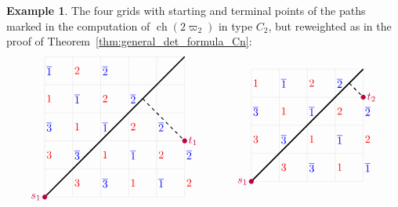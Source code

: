 \documentclass[11pt, leqno]{amsart}
\theoremstyle{plain}
\theoremstyle{definition}
\newtheorem{example}[theorem]{Example}
\numberwithin{equation}{section}
\newcommand{\fw}{\varpi} %
\newcommand{\ch}{\operatorname{ch}} %
\newcommand{\ofour}{\overline{4}}
\newcommand{\othree}{\overline{3}}
\newcommand{\otwo}{\overline{2}}
\newcommand{\one}{\overline{1}}
\begin{document}
\begin{example}
The four grids with starting and terminal points of the paths marked in the computation of $\ch(2\fw_2)$ in type $C_2$, but reweighted as in the proof of Theorem~\ref{thm:general_det_formula_Cn}:
\[
\begin{array}{c@{\hspace{30pt}}c}
\begin{tikzpicture}[baseline=2.5cm,scale=0.9]
\draw[gray!40,very thin] (0,0) grid (5,5);
\foreach \i in {0,...,2} \draw (2-\i,\i+0.5) node[right=-2pt,blue] {$\othree$};
\foreach \i in {0,...,4} \draw (4-\i,\i+0.5) node[right=-2pt,blue] {$\one$};
\foreach \i in {0,...,3} \draw (5-\i,\i+1.5) node[right=-2pt,blue] {$\otwo$};
\foreach \i in {0,1} \draw (1-\i,\i+0.5) node[right=-2pt,red] {$3$};
\foreach \i in {0,...,3} \draw (3-\i,\i+0.5) node[right=-2pt,red] {$1$};
\foreach \i in {0,...,4} \draw (5-\i,\i+0.5) node[right=-2pt,red] {$2$};
\draw[-, very thick] (0,0) -- (5,5);
\draw[thick,dashed] (3.5,3.5) -- +(1.5, -1.5);
\draw[fill=red, color=purple] (0, 0) circle (0.08) node[anchor=east] {$s_1$};
\draw[fill=red, color=purple] (5, 2) circle (0.08) node[anchor=west] {$t_1$};
\end{tikzpicture}
&
\begin{tikzpicture}[baseline=2cm,scale=0.9]
\draw[gray!40,very thin] (0,0) grid (4,4);
\foreach \i in {0,...,2} \draw (2-\i,\i+0.5) node[right=-2pt,blue] {$\othree$};
\foreach \i in {0,...,3} \draw (4-\i,\i+0.5) node[right=-2pt,blue] {$\one$};
\foreach \i in {0,...,1} \draw (4-\i,\i+2.5) node[right=-2pt,blue] {$\otwo$};
\foreach \i in {0,1} \draw (1-\i,\i+0.5) node[right=-2pt,red] {$3$};
\foreach \i in {0,...,3} \draw (3-\i,\i+0.5) node[right=-2pt,red] {$1$};
\foreach \i in {0,...,2} \draw (4-\i,\i+1.5) node[right=-2pt,red] {$2$};
\draw[-, very thick] (0,0) -- (4,4);
\draw[thick,dashed] (3.5,3.5) -- +(0.5, -0.5);
\draw[fill=red, color=purple] (0, 0) circle (0.08) node[anchor=east] {$s_1$};
\draw[fill=red, color=purple] (4, 3) circle (0.08) node[anchor=west] {$t_2$};
\end{tikzpicture}
\allowdisplaybreaks \\[3cm]
\begin{tikzpicture}[baseline=2cm,scale=0.9]

\end{tikzpicture}
\end{array}\]
\end{example}
\end{document}
